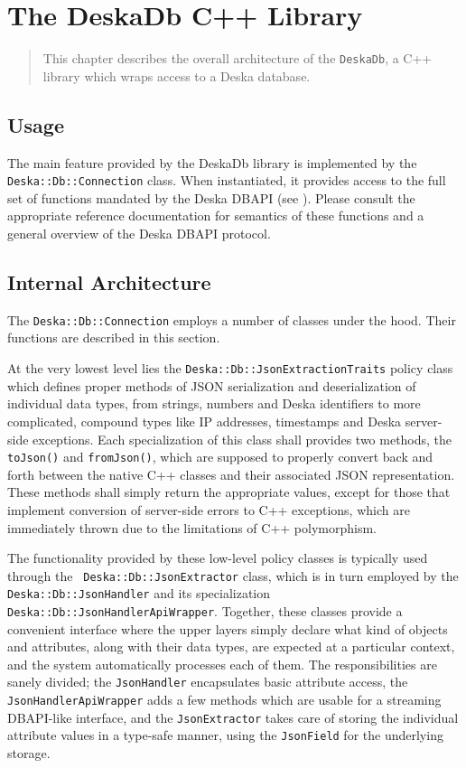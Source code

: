 \documentclass[deska]{subfiles}
\begin{document}
\chapter{The DeskaDb C++ Library}

\begin{abstract}
This chapter describes the overall architecture of the {\tt DeskaDb}, a C++ library which wraps access to a Deska
database.
\end{abstract}

\section{Usage}

The main feature provided by the DeskaDb library is implemented by the {\tt Deska::Db::Connection} class.  When
instantiated, it provides access to the full set of functions mandated by the Deska DBAPI (see ).
Please consult the appropriate reference documentation for semantics of these functions and a general overview of the
Deska DBAPI protocol.

\section{Internal Architecture}

The {\tt Deska::Db::Connection} employs a number of classes under the hood.  Their functions are described in this
section.

At the very lowest level lies the {\tt Deska::Db::JsonExtractionTraits} policy class which defines proper methods of
JSON serialization and deserialization of individual data types, from strings, numbers and Deska identifiers to more
complicated, compound types like IP addresses, timestamps and Deska server-side exceptions.  Each specialization of this
class shall provides two methods, the {\tt toJson()} and {\tt fromJson()}, which are supposed to properly convert back
and forth between the native C++ classes and their associated JSON representation.  These methods shall simply return
the appropriate values, except for those that implement conversion of server-side errors to C++ exceptions, which are
immediately thrown due to the limitations of C++ polymorphism.

The functionality provided by these low-level policy classes is typically used through the {\tt
Deska::Db::JsonExtractor} class, which is in turn employed by the {\tt Deska::Db::JsonHandler} and its specialization
{\tt Deska::Db::JsonHandlerApiWrapper}.  Together, these classes provide a convenient interface where the upper layers
simply declare what kind of objects and attributes, along with their data types, are expected at a particular context,
and the system automatically processes each of them.  The responsibilities are sanely divided; the {\tt JsonHandler}
encapsulates basic attribute access, the {\tt JsonHandlerApiWrapper} adds a few methods which are usable for a streaming
DBAPI-like interface, and the {\tt JsonExtractor} takes care of storing the individual attribute values in a type-safe
manner, using the {\tt JsonField} for the underlying storage.
\end{document}
